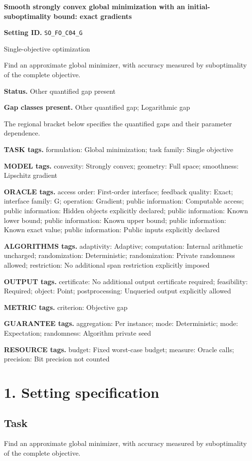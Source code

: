 \documentclass[10pt,a4paper]{article}
\begin{document}
\raggedright

{\LARGE\bfseries\sffamily\color{AtlasNavy} Smooth strongly convex global minimization with an initial-suboptimality bound: exact gradients\par}\vspace{5pt}
\textbf{Setting ID.} \texttt{SO\_\allowbreak{}FO\_\allowbreak{}C04\_\allowbreak{}G}

Single-objective optimization

Find an approximate global minimizer, with accuracy measured by suboptimality of the complete objective.

\textbf{Status.} Other quantified gap present

\textbf{Gap classes present.} Other quantified gap; Logarithmic gap

The regional bracket below specifies the quantified gaps and their parameter dependence.

\textbf{TASK tags.} formulation: Global minimization; task family: Single objective

\textbf{MODEL tags.} convexity: Strongly convex; geometry: Full space; smoothness: Lipschitz gradient

\textbf{ORACLE tags.} access order: First-order interface; feedback quality: Exact; interface family: G; operation: Gradient; public information: Computable access; public information: Hidden objects explicitly declared; public information: Known lower bound; public information: Known upper bound; public information: Known exact value; public information: Public inputs explicitly declared

\textbf{ALGORITHMS tags.} adaptivity: Adaptive; computation: Internal arithmetic uncharged; randomization: Deterministic; randomization: Private randomness allowed; restriction: No additional span restriction explicitly imposed

\textbf{OUTPUT tags.} certificate: No additional output certificate required; feasibility: Required; object: Point; postprocessing: Unqueried output explicitly allowed

\textbf{METRIC tags.} criterion: Objective gap

\textbf{GUARANTEE tags.} aggregation: Per instance; mode: Deterministic; mode: Expectation; randomness: Algorithm private seed

\textbf{RESOURCE tags.} budget: Fixed worst-case budget; measure: Oracle calls; precision: Bit precision not counted

\section{1. Setting specification}
\subsection{Task}
Find an approximate global minimizer, with accuracy measured by suboptimality of the complete objective.
\end{document}
